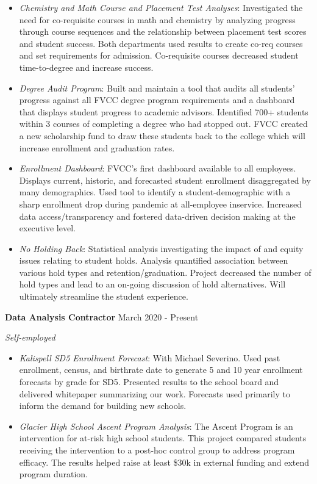 \documentclass[12pt]{article}
\begin{document}
\begin{itemize}

\item \textit{Chemistry and Math Course and Placement Test Analyses}: Investigated the need for co-requisite courses in math and chemistry by analyzing progress through course sequences and the relationship between placement test scores and student success. Both departments used results to create co-req courses and set requirements for admission. Co-requisite courses decreased student time-to-degree and increase success.

\item \textit{Degree Audit Program}: Built and maintain a tool that audits all students' progress against all FVCC degree program requirements and a dashboard that displays student progress to academic advisors. Identified 700+ students within 3 courses of completing a degree who had stopped out. FVCC created a new scholarship fund to draw these students back to the college which will increase enrollment and graduation rates.

\item \textit{Enrollment Dashboard}: FVCC's first dashboard available to all employees. Displays current, historic, and forecasted student enrollment disaggregated by many demographics. Used tool to identify a student-demographic with a sharp enrollment drop during pandemic at all-employee inservice.   Increased data access/transparency and fostered data-driven decision making at the executive level. 

\item \textit{No Holding Back}: Statistical analysis investigating the impact of and equity issues relating to student holds. Analysis quantified association between various hold types and retention/graduation. Project decreased the number of hold types and lead to an on-going discussion of hold alternatives. Will ultimately streamline the student experience.

\end{itemize} 


\noindent \textbf{Data Analysis Contractor} \hfill  March 2020 - Present

\textit{Self-employed} 

\begin{itemize}
\item \textit{Kalispell SD5 Enrollment Forecast}: With Michael Severino. Used past enrollment, census, and birthrate date to generate 5 and 10 year enrollment forecasts by grade for SD5. Presented results to the school board and delivered whitepaper summarizing our work. Forecasts used primarily to inform the demand for building new schools. 

\item \textit{Glacier High School Ascent Program Analysis}: The Ascent Program is an intervention for at-risk high school students.  This project compared students receiving the intervention to a post-hoc control group  to address program efficacy. 
The results helped raise at least \$30k in external funding and extend program duration.
\end{itemize}
\end{document}
